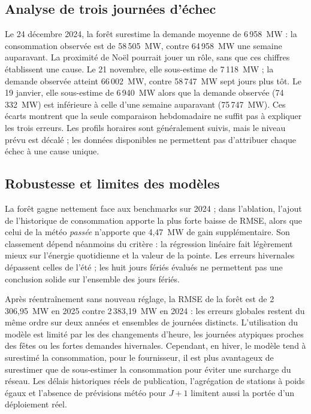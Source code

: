 \subsection{Analyse de trois journées d’échec}
\noindent

Le 24 décembre 2024, la forêt surestime la demande moyenne de 6\,958~MW : la consommation observée est de 58\,505~MW, contre 64\,958~MW une semaine auparavant. La proximité de Noël pourrait jouer un rôle, sans que ces chiffres établissent une cause. Le 21 novembre, elle sous-estime de 7\,118~MW ; la demande observée atteint 66\,002~MW, contre 58\,747~MW sept jours plus tôt. Le 19 janvier, elle sous-estime de 6\,940~MW alors que la demande observée (74\,332~MW) est inférieure à celle d'une semaine auparavant (75\,747~MW). Ces écarts montrent que la seule comparaison hebdomadaire ne suffit pas à expliquer les trois erreurs. Les profils horaires sont généralement suivis, mais le niveau prévu est décalé ; les données disponibles ne permettent pas d'attribuer chaque échec à une cause unique.

\subsection{Robustesse et limites des modèles}
\noindent

La forêt gagne nettement face aux benchmarks sur 2024 ; dans l'ablation, l'ajout de l'historique de consommation apporte la plus forte baisse de RMSE, alors que celui de la météo \emph{passée} n'apporte que 4,47~MW de gain supplémentaire. Son classement dépend néanmoins du critère : la régression linéaire fait légèrement mieux sur l'énergie quotidienne et la valeur de la pointe. Les erreurs hivernales dépassent celles de l'été ; les huit jours fériés évalués ne permettent pas une conclusion solide sur l'ensemble des jours fériés. 

Après réentraînement sans nouveau réglage, la RMSE de la forêt est de 2\,306,95~MW en 2025 contre 2\,383,19~MW en 2024 : les erreurs globales restent du même ordre sur deux années et ensembles de journées distincts. L'utilisation du modèle est limité par les des changements d'heure, les journées atypiques proches des fêtes ou les fortes demandes hivernales. Cependant, en hiver, le modèle tend à surestimé la consommation, pour le fournisseur, il est plus avantageux de surestimer que de sous-estimer la consommation pour éviter une surcharge du réseau. Les délais historiques réels de publication, l'agrégation de stations à poids égaux et l'absence de prévisions météo pour $J+1$ limitent aussi la portée d'un déploiement réel.

